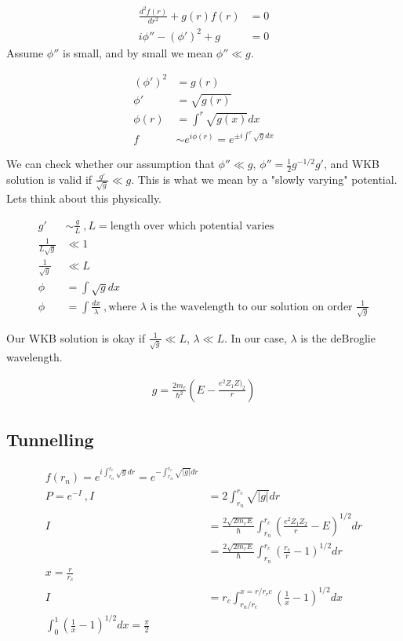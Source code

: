 \documentclass[10pt,a4paper]{article}
\begin{document}
\begin{align}
\frac{d^2 f(r)}{dr^2} + g(r)f(r) & = 0\\
i\phi'' - (\phi')^2 + g&=0
\end{align}
Assume $\phi''$ is small, and by small we mean $\phi'' \ll g$. 

\begin{align}
(\phi')^2 &= g(r)\\
\phi' & = \sqrt{g(r)}\\
\phi(r) & = \int^r \sqrt{g(x)}dx\\
f & \sim e^{i\phi(r)} = e^{ \pm i\int^r \sqrt{g}dx}
\end{align}

We can check whether our assumption that $\phi'' \ll g$, $\phi'' = \frac{1}{2}g^{-1/2}g'$, and WKB solution is valid if $\frac{g'}{\sqrt{g}} \ll g$. This is what we mean by a "slowly varying" potential. Lets think about this physically. 

\begin{align}
g' &\sim \frac{g}{L}~,L = \text{length over which potential varies}\\
\frac{1}{L\sqrt{g}} &\ll 1\\
\frac{1}{\sqrt{g}} & \ll L\\
\phi &= \int \sqrt{g}dx\\
\phi &= \int \frac{dx}{\lambda}~,\text{where $\lambda$ is the wavelength to our solution on order $\frac{1}{\sqrt{g}}$}
\end{align}

Our WKB solution is okay if $\frac{1}{\sqrt{g}} \ll L$, $\lambda \ll L$. In our case, $\lambda$ is the deBroglie wavelength. 

\begin{align}
g = \frac{2m_r}{\hbar^2} \left( E - \frac{e^2 Z_1 Z)_2}{r}\right)
\end{align}


\subsection{Tunnelling}

\begin{align}
f(r_n) = e^{i \int_{r_n}^{r_c} \sqrt{g} dr} = e^{-\int_{r_n}^{r_c} \sqrt{|g|}dr}\\
P = e^{-I}~, I &= 2\int_{r_n}^{r_c} \sqrt{|g|}dr\\
I &= \frac{2\sqrt{2m_rE}}{\hbar} \int_{r_n}^{r_c} \left(  \frac{e^2 Z_1 Z_2}{r} -E \right)^{1/2} dr\\
& = \frac{2\sqrt{2m_rE}}{\hbar}    \int_{r_n}^{r_c} \left( \frac{r_c}{r} -1 \right)^{1/2}dr\\
x = \frac{r}{r_c}\\
I & = r_c \int_{r_n/r_c}^{x=r/r_rc} \left(\frac{1}{x}-1\right)^{1/2}dx\\
\int_0^1 \left(\frac{1}{x}-1\right)^{1/2}dx = \frac{\pi}{2}
\end{align}
\end{document}
